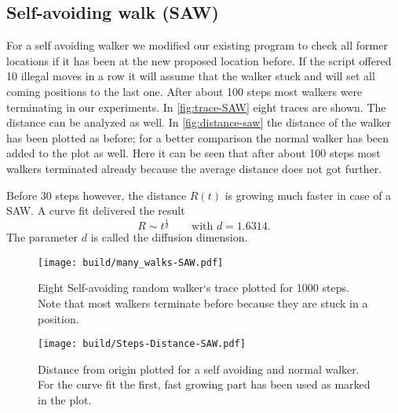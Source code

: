 \documentclass{article}
\begin{document}
\subsection{Self-avoiding walk (SAW)}
\label{sec:Normal Walker}
For a self avoiding walker we modified our existing program to check all former locations if it has been at the new proposed location before. If the script offered 10 illegal moves in a row it will assume that the walker stuck and
will set all coming positions to the last one. After about 100 steps most walkers were terminating in our
experiments. In \autoref{fig:trace-SAW} eight traces are shown. The distance can be analyzed as well. In 
\autoref{fig:distance-saw} the distance of the walker has been plotted as before; for a better comparison the 
normal walker has been added to the plot as well. Here it can be seen that after about 100 steps most walkers 
terminated already because the average distance does not got further.

Before 30 steps however, the distance $R(t)$ is growing much faster in case of a SAW. A curve fit delivered the
result 
\[
  R \sim t^\frac{1}{d} \qquad \text{with } d = 1.6314.
\]
The parameter $d$ is called the diffusion dimension.
\begin{figure}
	\centering
	\texttt{[image: build/many\_walks-SAW.pdf]}
	\caption{Eight Self-avoiding random walker`s trace plotted for 1000 steps. Note that most walkers terminate 
           before because they are stuck in a position.}
  \label{fig:trace-SAW}
\end{figure}
\begin{figure}
	\centering
	\texttt{[image: build/Steps-Distance-SAW.pdf]}
  \caption{Distance from origin plotted for a self avoiding and normal walker. For the curve fit the first, fast 
            growing part has been used as marked in the plot.}
  \label{fig:distance-saw}
\end{figure}
\end{document}
